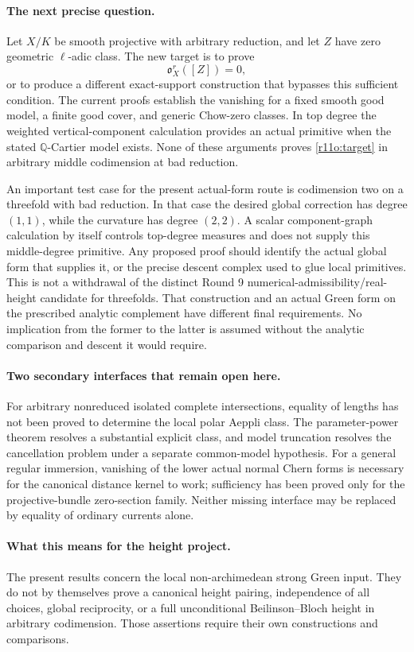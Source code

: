 \paragraph{The next precise question.}
Let $X/K$ be smooth projective with arbitrary reduction, and let
$Z$ have zero geometric $\ell$-adic class.  The new target is to prove
\[
             \mathfrak o_X^r([Z])=0,
\tag{OC3}\label{r11o:target}
\]
or to produce a different exact-support construction that bypasses
this sufficient condition.  The current proofs establish the
vanishing for a fixed smooth good model, a finite good cover, and
generic Chow-zero classes.  In top degree the weighted vertical-component
calculation provides an actual primitive when the stated
$\mathbb Q$-Cartier model exists.  None of these arguments proves
\eqref{r11o:target} in arbitrary middle codimension at bad reduction.

An important test case for the present actual-form route is
codimension two on a threefold with bad reduction.  In that case
the desired global correction has degree $(1,1)$, while the curvature
has degree $(2,2)$.  A scalar component-graph calculation by itself
controls top-degree measures and does not supply this middle-degree
primitive.  Any proposed proof should identify the actual global
form that supplies it, or the precise descent complex used to glue
local primitives.  This is not a withdrawal of the distinct Round 9
numerical-admissibility/real-height candidate for threefolds.  That
construction and an actual Green form on the prescribed analytic
complement have different final requirements.  No implication from
the former to the latter is assumed without the analytic comparison
and descent it would require.

\paragraph{Two secondary interfaces that remain open here.}
For arbitrary nonreduced isolated complete intersections, equality
of lengths has not been proved to determine the local polar Aeppli
class.  The parameter-power theorem resolves a substantial explicit
class, and model truncation resolves the cancellation problem under
a separate common-model hypothesis.  For a general regular immersion,
vanishing of the lower actual normal Chern forms is necessary for
the canonical distance kernel to work; sufficiency has been proved
only for the projective-bundle zero-section family.  Neither missing
interface may be replaced by equality of ordinary currents alone.

\paragraph{What this means for the height project.}
The present results concern the local non-archimedean strong Green
input.  They do not by themselves prove a canonical height pairing,
independence of all choices, global reciprocity, or a full
unconditional Beilinson--Bloch height in arbitrary codimension.
Those assertions require their own constructions and comparisons.
